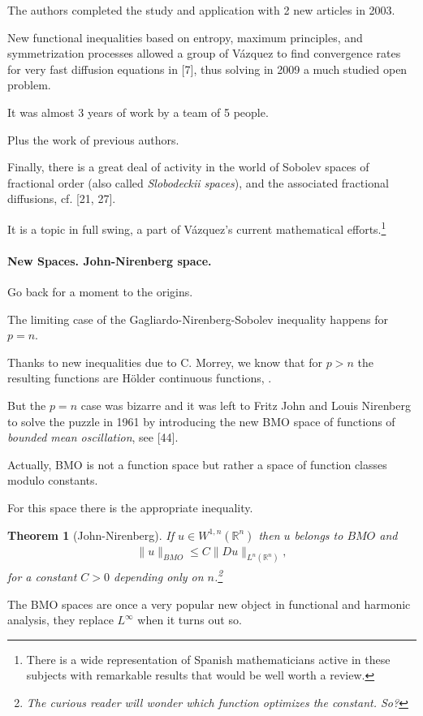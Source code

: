 \documentclass{article}
\newtheorem{theorem}{Theorem}
\begin{document}
The authors completed the study and application with 2 new articles in 2003.

New functional inequalities based on entropy, maximum principles, and symmetrization processes allowed a group of V\'azquez to find convergence rates for very fast diffusion equations in [7], thus solving in 2009 a much studied open problem.

It was almost 3 years of work by a team of 5 people.

Plus the work of previous authors.

%
Finally, there is a great deal of activity in the world of Sobolev spaces of fractional order (also called \textit{Slobodeckii spaces}), and the associated fractional diffusions, cf. [21, 27].

It is a topic in full swing, a part of V\'azquez's current mathematical efforts.\footnote{There is a wide representation of Spanish mathematicians active in these subjects with remarkable results that would be well worth a review.}

\paragraph{New Spaces. John-Nirenberg space.} Go back for a moment to the origins.

The limiting case of the Gagliardo-Nirenberg-Sobolev inequality happens for $p = n$.

Thanks to new inequalities due to C. Morrey, we know that for $p > n$ the resulting functions are H\"older continuous functions, \cite{Evans2010}.

But the $p = n$ case was bizarre and it was left to Fritz John and Louis Nirenberg to solve the puzzle in 1961 by introducing the new BMO space of functions of \textit{bounded mean oscillation}, see [44].

Actually, BMO is not a function space but rather a space of function classes modulo constants.

For this space there is the appropriate inequality.

\begin{theorem}[John-Nirenberg]
	If $u\in W^{1,n}(\mathbb{R}^n)$ then $u$ belongs to $BMO$ and
	\begin{align*}
		\|u\|_{BMO}\le C\|Du\|_{L^n(\mathbb{R}^n)},
	\end{align*}
	for a constant $C > 0$ depending only on $n$.\footnote{The curious reader will wonder which function optimizes the constant. So?}
\end{theorem}
The BMO spaces are once a very popular new object in functional and harmonic analysis, they replace $L^\infty$ when it turns out so.
\end{document}
